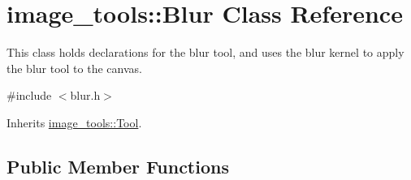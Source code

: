 \hypertarget{classimage__tools_1_1Blur}{}\section{image\+\_\+tools\+:\+:Blur Class Reference}
\label{classimage__tools_1_1Blur}


This class holds declarations for the blur tool, and uses the blur kernel to apply the blur tool to the canvas.  




{\ttfamily \#include $<$blur.\+h$>$}



Inherits \hyperlink{classimage__tools_1_1Tool}{image\+\_\+tools\+::\+Tool}.

\subsection*{Public Member Functions}
